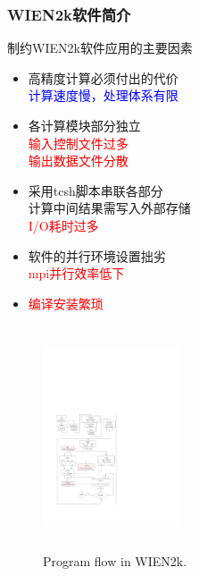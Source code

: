 \frame
{
	\frametitle{\textrm{WIEN2k}软件简介}
\begin{minipage}[t]{0.55\textwidth}
	制约\textrm{WIEN2k}软件应用的主要因素
	\begin{itemize}
		\item 高精度计算必须付出的代价\\
			\textcolor{blue}{计算速度慢，处理体系有限}
		\item 各计算模块部分独立\\
			\textcolor{red}{输入控制文件过多}\\
			\textcolor{red}{输出数据文件分散}
		\item 采用\textrm{tcsh}脚本串联各部分\\
			计算中间结果需写入外部存储\\
			\textcolor{red}{\textrm{I/O}耗时过多}
		\item 软件的并行环境设置拙劣\\
			\textcolor{red}{\textrm{mpi}并行效率低下}
		\item \textcolor{red}{编译安装繁琐}
	\end{itemize}
\end{minipage}
\hfill
\begin{minipage}[t]{0.43\textwidth}
\begin{figure}[h!]
\centering
\vspace*{-10pt}
\includegraphics[height=2.6in,width=1.60in,viewport=60 90 325 500,clip]{Figures/WIEN2k_Program_flow.pdf}
\caption{\tiny \textrm{Program flow in WIEN2k.}}%
\label{WIEN2k_program_flow}
\end{figure}
\end{minipage}
}

